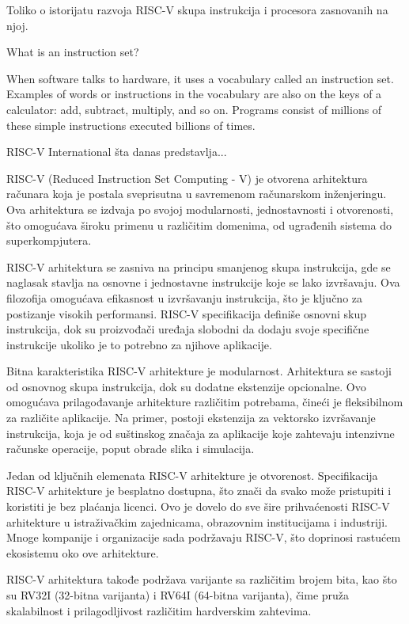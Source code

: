 \documentclass[12pt,oneside]{memoir}
\begin{document}
Toliko o istorijatu razvoja RISC-V skupa instrukcija i procesora zasnovanih na njoj.

What is an instruction set?

When software talks to hardware, it uses a vocabulary called an instruction set. Examples of words or instructions in the vocabulary are also on the keys of a calculator: add, subtract, multiply, and so on. Programs consist of millions of these simple instructions executed billions of times.



RISC-V International šta danas predstavlja...

RISC-V (Reduced Instruction Set Computing - V) je otvorena arhitektura računara 
koja je postala sveprisutna u savremenom računarskom inženjeringu. Ova arhitektura 
se izdvaja po svojoj modularnosti, jednostavnosti i otvorenosti, što omogućava 
široku primenu u različitim domenima, od ugrađenih sistema do superkompjutera.

RISC-V arhitektura se zasniva na principu smanjenog skupa instrukcija, gde se 
naglasak stavlja na osnovne i jednostavne instrukcije koje se lako izvršavaju. Ova 
filozofija omogućava efikasnost u izvršavanju instrukcija, što je ključno za 
postizanje visokih performansi. RISC-V specifikacija definiše osnovni skup 
instrukcija, dok su proizvođači uređaja slobodni da dodaju svoje specifične 
instrukcije ukoliko je to potrebno za njihove aplikacije.

Bitna karakteristika RISC-V arhitekture je modularnost. Arhitektura se sastoji od osnovnog skupa instrukcija, dok su dodatne ekstenzije opcionalne. Ovo omogućava prilagođavanje arhitekture različitim potrebama, čineći je fleksibilnom za različite aplikacije. Na primer, postoji ekstenzija za vektorsko izvršavanje instrukcija, koja je od suštinskog značaja za aplikacije koje zahtevaju intenzivne računske operacije, poput obrade slika i simulacija.

Jedan od ključnih elemenata RISC-V arhitekture je otvorenost. Specifikacija RISC-V arhitekture je besplatno dostupna, što znači da svako može pristupiti i koristiti je bez plaćanja licenci. Ovo je dovelo do sve šire prihvaćenosti RISC-V arhitekture u istraživačkim zajednicama, obrazovnim institucijama i industriji. Mnoge kompanije i organizacije sada podržavaju RISC-V, što doprinosi rastućem ekosistemu oko ove arhitekture.

RISC-V arhitektura takođe podržava varijante sa različitim brojem bita, kao što su RV32I (32-bitna varijanta) i RV64I (64-bitna varijanta), čime pruža skalabilnost i prilagodljivost različitim hardverskim zahtevima.
\end{document}
